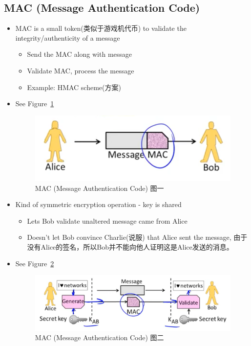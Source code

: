 \documentclass[12pt]{ctexart}   %
\begin{document}
	\subsection{MAC (Message Authentication Code)}
	\begin{itemize}
		\item MAC is a small token(类似于游戏机代币) to validate the integrity/authenticity of a message
		\begin{itemize}
			\item Send the MAC along with message
			\item Validate MAC, process the message
			\item Example: HMAC scheme(方案)
		\end{itemize}
		\item See Figure~\ref{fig:10-3-3}
		  
		\begin{figure}[h!] %
		\centering
		\includegraphics[scale=0.7]{images/10-3-3}
		\caption{MAC (Message Authentication Code) 图一}
		\label{fig:10-3-3}
		\end{figure}

		\item Kind of symmetric encryption operation - key is shared
		\begin{itemize}
			\item Lets Bob validate unaltered message came from Alice
			\item Doesn't let Bob convince Charlie(说服) that Alice sent the message, 由于没有Alice的签名，所以Bob并不能向他人证明这是Alice发送的消息。
		\end{itemize}
		\item See Figure~\ref{fig:10-3-4}
		  
		\begin{figure}[h!] %
		\centering
		\includegraphics[scale=0.7]{images/10-3-4}
		\caption{MAC (Message Authentication Code) 图二}
		\label{fig:10-3-4}
		\end{figure}
	\end{itemize}
\end{document}
